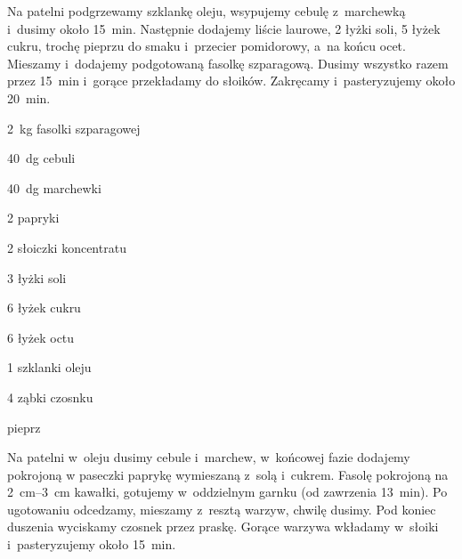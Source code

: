 \documentclass[../kucharek.tex]{subfiles}
\begin{document}
Na patelni podgrzewamy szklankę oleju, wsypujemy cebulę z~marchewką i~dusimy
około \qty{15}{\minute}. Następnie dodajemy liście laurowe, \num{2} łyżki soli,
\num{5} łyżek cukru, trochę pieprzu do smaku i~przecier pomidorowy, a~na końcu
ocet. Mieszamy i~dodajemy podgotowaną fasolkę szparagową. Dusimy wszystko razem
przez \qty{15}{\minute} i~gorące przekładamy do słoików. Zakręcamy
i~pasteryzujemy około \qty{20}{\minute}.


\begin{Ingred}
    \item \qty{2}{\kilo\gram} fasolki szparagowej
    \item \qty{40}{\deka\gram} cebuli
    \item \qty{40}{\deka\gram} marchewki
    \item \num{2} papryki
    \item \num{2} słoiczki koncentratu
    \item \num{3} łyżki soli
    \item \num{6} łyżek cukru
    \item \num{6} łyżek octu
    \item \num{1} szklanki oleju
    \item \num{4} ząbki czosnku
    \item pieprz
\end{Ingred}

Na patelni w~oleju dusimy cebule i~marchew, w~końcowej fazie dodajemy pokrojoną
w paseczki paprykę wymieszaną z~solą i~cukrem. Fasolę pokrojoną na
\qtyrange{2}{3}{\centi\metre} kawałki, gotujemy w~oddzielnym garnku (od
zawrzenia \qty{13}{\minute}). Po ugotowaniu odcedzamy, mieszamy z~resztą
warzyw, chwilę dusimy. Pod koniec duszenia wyciskamy czosnek przez praskę.
Gorące warzywa wkładamy w~słoiki i~pasteryzujemy około \qty{15}{\minute}.
\end{document}
